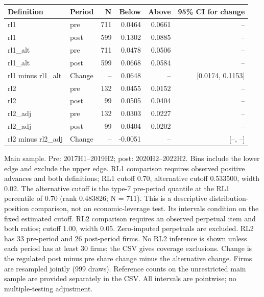 \begin{threeparttable}
\begin{tabular}{llrrrr}
\toprule
Definition & Period & N & Below & Above & 95\% CI for change \\
\midrule
rl1 & pre & 711 & 0.0464 & 0.0661 & -- \\
rl1 & post & 599 & 0.1302 & 0.0885 & -- \\
rl1\_alt & pre & 711 & 0.0478 & 0.0506 & -- \\
rl1\_alt & post & 599 & 0.0668 & 0.0584 & -- \\
rl1 minus rl1\_alt & Change & -- & 0.0648 & -- & [0.0174, 0.1153] \\
rl2 & pre & 132 & 0.0455 & 0.0152 & -- \\
rl2 & post & 99 & 0.0505 & 0.0404 & -- \\
rl2\_adj & pre & 132 & 0.0303 & 0.0227 & -- \\
rl2\_adj & post & 99 & 0.0404 & 0.0202 & -- \\
rl2 minus rl2\_adj & Change & -- & -0.0051 & -- & [--, --] \\
\bottomrule
\end{tabular}
\begin{tablenotes}[flushleft]
\footnotesize
\item Main sample. Pre: 2017H1--2019H2; post: 2020H2--2022H2. Bins include the lower edge and exclude the upper edge. RL1 comparison requires observed positive advances and both definitions; RL1 cutoff 0.70, alternative cutoff 0.533500, width 0.02. The alternative cutoff is the type-7 pre-period quantile at the RL1 percentile of 0.70 (rank 0.483826; N = 711). This is a descriptive distribution-position comparison, not an economic-leverage test. Its intervals condition on the fixed estimated cutoff. RL2 comparison requires an observed perpetual item and both ratios; cutoff 1.00, width 0.05. Zero-imputed perpetuals are excluded. RL2 has 33 pre-period and 26 post-period firms. No RL2 inference is shown unless each period has at least 30 firms; the CSV gives coverage exclusions. Change is the regulated post minus pre share change minus the alternative change. Firms are resampled jointly (999 draws). Reference counts on the unrestricted main sample are provided separately in the CSV. All intervals are pointwise; no multiple-testing adjustment.
\end{tablenotes}
\end{threeparttable}
